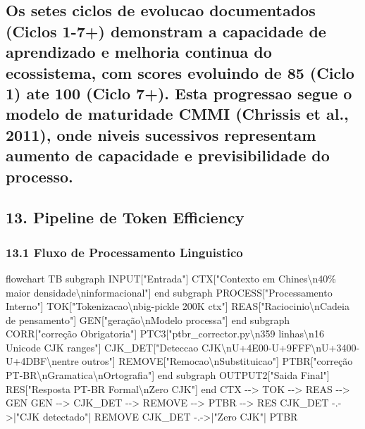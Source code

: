 \documentclass[
  12pt,
]{article}
\newenvironment{Shaded}{}{}
\newcommand{\NormalTok}[1]{#1}
\begin{document}
\subsection{Os setes ciclos de evolucao documentados (Ciclos 1-7+)
demonstram a capacidade de aprendizado e melhoria continua do
ecossistema, com scores evoluindo de 85 (Ciclo 1) ate 100 (Ciclo 7+).
Esta progressao segue o modelo de maturidade CMMI (Chrissis et al.,
2011), onde niveis sucessivos representam aumento de capacidade e
previsibilidade do
processo.}\label{os-setes-ciclos-de-evolucao-documentados-ciclos-1-7-demonstram-a-capacidade-de-aprendizado-e-melhoria-continua-do-ecossistema-com-scores-evoluindo-de-85-ciclo-1-ate-100-ciclo-7.-esta-progressao-segue-o-modelo-de-maturidade-cmmi-chrissis-et-al.-2011-onde-niveis-sucessivos-representam-aumento-de-capacidade-e-previsibilidade-do-processo.}

\subsection{13. Pipeline de Token
Efficiency}\label{pipeline-de-token-efficiency}

\subsubsection{13.1 Fluxo de Processamento
Linguistico}\label{fluxo-de-processamento-linguistico}

\begin{Shaded}
\begin{Highlighting}[]
\NormalTok{flowchart TB}
\NormalTok{subgraph INPUT["Entrada"]}
\NormalTok{CTX["Contexto em Chines\textbackslash{}n40\% maior densidade\textbackslash{}ninformacional"]}
\NormalTok{end}
\NormalTok{subgraph PROCESS["Processamento Interno"]}
\NormalTok{TOK["Tokenizacao\textbackslash{}nbig{-}pickle 200K ctx"]}
\NormalTok{REAS["Raciocinio\textbackslash{}nCadeia de pensamento"]}
\NormalTok{GEN["geração\textbackslash{}nModelo processa"]}
\NormalTok{end}
\NormalTok{subgraph CORR["correção Obrigatoria"]}
\NormalTok{PTC3["ptbr\_corrector.py\textbackslash{}n359 linhas\textbackslash{}n16 Unicode CJK ranges"]}
\NormalTok{CJK\_DET["Deteccao CJK\textbackslash{}nU+4E00{-}U+9FFF\textbackslash{}nU+3400{-}U+4DBF\textbackslash{}nentre outros"]}
\NormalTok{REMOVE["Remocao\textbackslash{}nSubstituicao"]}
\NormalTok{PTBR["correção PT{-}BR\textbackslash{}nGramatica\textbackslash{}nOrtografia"]}
\NormalTok{end}
\NormalTok{subgraph OUTPUT2["Saida Final"]}
\NormalTok{RES["Resposta PT{-}BR Formal\textbackslash{}nZero CJK"]}
\NormalTok{end}
\NormalTok{CTX {-}{-}\textgreater{} TOK {-}{-}\textgreater{} REAS {-}{-}\textgreater{} GEN}
\NormalTok{GEN {-}{-}\textgreater{} CJK\_DET {-}{-}\textgreater{} REMOVE {-}{-}\textgreater{} PTBR {-}{-}\textgreater{} RES}
\NormalTok{CJK\_DET {-}.{-}\textgreater{}|"CJK detectado"| REMOVE}
\NormalTok{CJK\_DET {-}.{-}\textgreater{}|"Zero CJK"| PTBR}
\end{Highlighting}
\end{Shaded}
\end{document}

